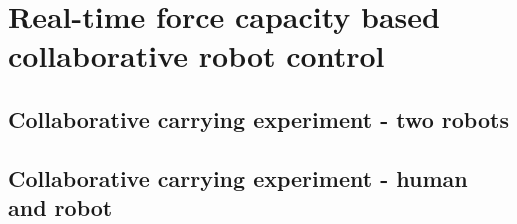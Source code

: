 
\chapter{Real-time force capacity based collaborative robot control} %

\label{ch:force_capacity} %



\section{Collaborative carrying experiment - two robots}
\section{Collaborative carrying experiment - human and robot}